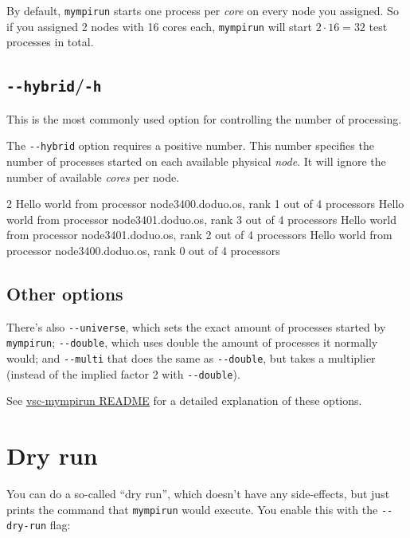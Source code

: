 By default, \lstinline|mympirun| starts one process per \emph{core} on every node you assigned.
So if you assigned 2 nodes with 16 cores each, \lstinline|mympirun| will
start $2\cdot16=32$ test processes in total.

\subsection{\texttt{-{}-hybrid}/\texttt{-h}}

This is the most commonly used option for controlling the number of processing.

The \lstinline|--hybrid| option requires a positive number. This number specifies
the number of processes started on each available physical \emph{node}. It will ignore
the number of available \emph{cores} per node.

\begin{prompt}
2
Hello world from processor node3400.doduo.os, rank 1 out of 4 processors
Hello world from processor node3401.doduo.os, rank 3 out of 4 processors
Hello world from processor node3401.doduo.os, rank 2 out of 4 processors
Hello world from processor node3400.doduo.os, rank 0 out of 4 processors
\end{prompt}

\subsection{Other options}

There's also \lstinline|--universe|, which sets the exact amount of processes started by \lstinline|mympirun|;
\lstinline|--double|, which uses double the amount of processes it normally would;
and \lstinline|--multi| that does the same as \lstinline|--double|, but takes a multiplier
(instead of the implied factor 2 with \lstinline|--double|).

See \href{https://github.com/hpcugent/vsc-mympirun/blob/master/README.md}{vsc-mympirun README}
for a detailed explanation of these options.

\section{Dry run}

You can do a so-called ``dry run'', which doesn't have any side-effects, but just
prints the command that \lstinline|mympirun| would execute. You enable this with the \lstinline|--dry-run| flag:

